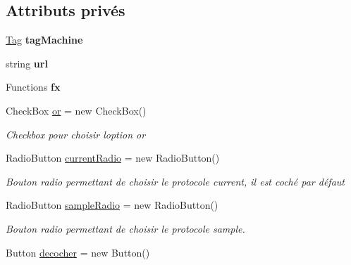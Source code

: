 \subsection*{Attributs privés}
\begin{DoxyCompactItemize}
\item 
\mbox{\label{class_m_t_connect_agent_1_1_user_control_display_tab_adb85fd45a6e04656bf4eed212040e1a9}} 
\mbox{\hyperlink{class_m_t_connect_agent_1_1_model_1_1_tag}{Tag}} {\bfseries tag\+Machine}
\item 
\mbox{\label{class_m_t_connect_agent_1_1_user_control_display_tab_aadac9f472866bf956cae2bd897200e1a}} 
string {\bfseries url}
\item 
\mbox{\label{class_m_t_connect_agent_1_1_user_control_display_tab_addffe628fc1709f3f186bdaa1946e558}} 
Functions {\bfseries fx}
\item 
Check\+Box \mbox{\hyperlink{class_m_t_connect_agent_1_1_user_control_display_tab_a31fcb431f108a7067f9293700d985a7b}{or}} = new Check\+Box()
\begin{DoxyCompactList}\small\item\em Checkbox pour choisir l\textquotesingle{}option or \end{DoxyCompactList}\item 
Radio\+Button \mbox{\hyperlink{class_m_t_connect_agent_1_1_user_control_display_tab_ae9cb8140db2e3be2016b811f1df7010a}{current\+Radio}} = new Radio\+Button()
\begin{DoxyCompactList}\small\item\em Bouton radio permettant de choisir le protocole current, il est coché par défaut \end{DoxyCompactList}\item 
Radio\+Button \mbox{\hyperlink{class_m_t_connect_agent_1_1_user_control_display_tab_afd8149a27f0eca9e61e12880fce8bdc9}{sample\+Radio}} = new Radio\+Button()
\begin{DoxyCompactList}\small\item\em Bouton radio permettant de choisir le protocole sample. \end{DoxyCompactList}\item 
Button \mbox{\hyperlink{class_m_t_connect_agent_1_1_user_control_display_tab_a0dfedd189ce40e92ee9621a790ec5b9f}{decocher}} = new Button()

\end{DoxyCompactItemize}
